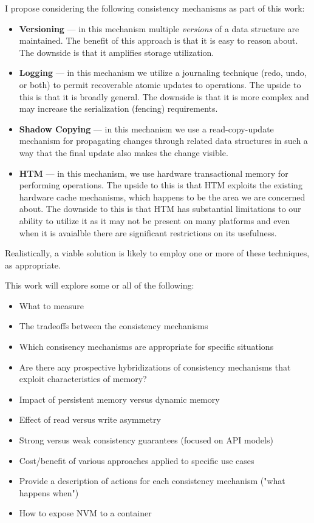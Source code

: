 \documentclass[letterpaper,twocolumn,10pt]{article}
\begin{document}
I propose considering the following consistency mechanisms as part of this work:

\begin{itemize}
    \item \textbf{Versioning} --- in this mechanism multiple \textit{versions} of a data structure are maintained.  The benefit of this approach is
    that it is easy to reason about.  The downside is that it amplifies storage utilization.
    \item \textbf{Logging} --- in this mechanism we utilize a journaling technique (redo, undo, or both) to permit recoverable atomic updates to
    operations.  The upside to this is that it is broadly general.  The downside is that it is more complex and may increase the serialization (fencing) requirements.
    \item \textbf{Shadow Copying} --- in this mechanism we use a read-copy-update mechanism for propagating changes through related data structures in
    such a way that the final update also makes the change visible.
    \item \textbf{HTM} --- in this mechanism, we use hardware transactional memory for performing operations.  The upside to this is that HTM exploits
    the existing hardware cache mechanisms, which happens to be the area we are concerned about.  The downside to this is that HTM has substantial
    limitations to our ability to utilize it as it may not be present on many platforms and even when it is avaialble there are significant
    restrictions on its usefulness.
\end{itemize}

Realistically, a viable solution is likely to employ one or more of these techniques, as appropriate.

This work will explore some or all of the following:

\begin{itemize}
    \item What to measure
    \item The tradeoffs between the consistency mechanisms
    \item Which consisency mechanisms are appropriate for specific situations
    \item Are there any prospective hybridizations of consistency mechanisms that exploit characteristics of memory?
    \item Impact of persistent memory versus dynamic memory
    \item Effect of read versus write asymmetry
    \item Strong versus weak consistency guarantees (focused on API models)
    \item Cost/benefit of various approaches applied to specific use cases
    \item Provide a description of actions for each consistency mechanism ("what happens when")
    \item How to expose NVM to a container
\end{itemize}
\end{document}
